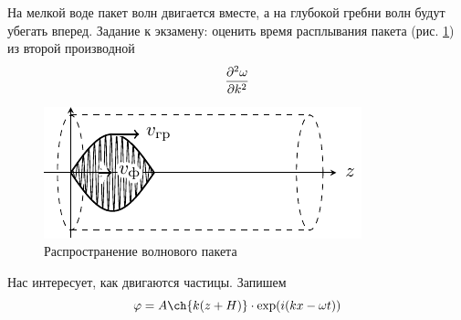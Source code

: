 На мелкой воде пакет волн двигается вместе, а на глубокой гребни волн будут убегать вперед. Задание к экзамену: оценить время расплывания пакета (рис. \ref{fig:wavelet}) из второй производной
\begin{equation}
	\pdv[2]{\omega}{k} 	
\end{equation} 

\begin{figure}[H]
    \centering
    \includegraphics[scale=1.5]{photo/wavelet.pdf}
    \caption{Распространение волнового пакета}
    \label{fig:wavelet}
\end{figure}

Нас интересует, как двигаются частицы. Запишем 
\begin{equation}
	\phi=A\ch{k(z+H)}\cdot\exp(i(kx-\omega t))
\end{equation}







